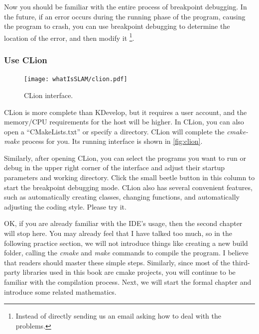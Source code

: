 Now you should be familiar with the entire process of breakpoint debugging. In the future, if an error occurs during the running phase of the program, causing the program to crash, you can use breakpoint debugging to determine the location of the error, and then modify it \footnote{Instead of directly sending us an email asking how to deal with the problems. }.

\subsubsection{Use CLion}
\begin{figure}[!t]
    \centering
    \texttt{[image: whatIsSLAM/clion.pdf]}
    \caption{CLion interface.}
    \label{fig:clion}
\end{figure}

CLion is more complete than KDevelop, but it requires a user account, and the memory/CPU requirements for the host will be higher. In CLion, you can also open a ``CMakeLists.txt'' or specify a directory. CLion will complete the \textit{cmake-make} process for you. Its running interface is shown in \autoref{fig:clion}.

Similarly, after opening CLion, you can select the programs you want to run or debug in the upper right corner of the interface and adjust their startup parameters and working directory. Click the small beetle button in this column to start the breakpoint debugging mode. CLion also has several convenient features, such as automatically creating classes, changing functions, and automatically adjusting the coding style. Please try it.

OK, if you are already familiar with the IDE's usage, then the second chapter will stop here. You may already feel that I have talked too much, so in the following practice section, we will not introduce things like creating a new build folder, calling the \textit{cmake} and \textit{make} commands to compile the program. I believe that readers should master these simple steps. Similarly, since most of the third-party libraries used in this book are cmake projects, you will continue to be familiar with the compilation process. Next, we will start the formal chapter and introduce some related mathematics.

